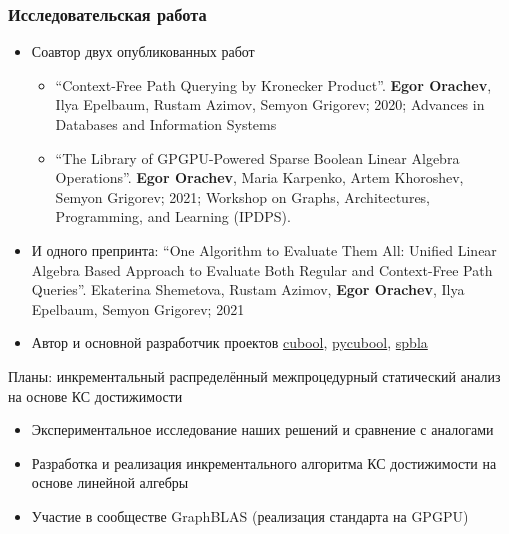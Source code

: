 \documentclass[xcolor=table,aspectratio=169]{beamer}
\begin{document}
\begin{frame}[fragile] \frametitle{Исследовательская работа}
  
    \begin{itemize}
        \item Соавтор двух опубликованных работ
            \begin{itemize}
              \item ``Context-Free Path Querying by Kronecker Product''. \textbf{Egor Orachev}, Ilya Epelbaum, Rustam Azimov, Semyon Grigorev; 2020; Advances in Databases and Information Systems
              \item ``The Library of GPGPU-Powered Sparse Boolean Linear Algebra Operations''. \textbf{Egor Orachev}, Maria Karpenko, Artem Khoroshev, Semyon Grigorev; 2021; Workshop on Graphs, Architectures, Programming, and Learning (IPDPS).
            \end{itemize}

        \item И одного препринта: ``One Algorithm to Evaluate Them All: Unified Linear Algebra Based Approach to Evaluate Both Regular and Context-Free Path Queries''. Ekaterina Shemetova, Rustam Azimov, \textbf{Egor Orachev}, Ilya Epelbaum, Semyon Grigorev; 2021
        \item Автор и основной разработчик проектов \href{https://github.com/JetBrains-Research/cuBool}{cubool}, \href{https://pypi.org/project/pycubool/}{pycubool}, \href{https://github.com/JetBrains-Research/spbla}{spbla}
    \end{itemize}
  \pause
  \vfill
  Планы: инкрементальный распределённый межпроцедурный статический анализ на основе КС достижимости
  \begin{itemize}
        \item Экспериментальное исследование наших решений и сравнение с аналогами
        \item Разработка и реализация инкрементального алгоритма КС достижимости на основе линейной алгебры
        \item Участие в сообществе GraphBLAS (реализация стандарта на GPGPU)
  \end{itemize}

\end{frame}
\end{document}
